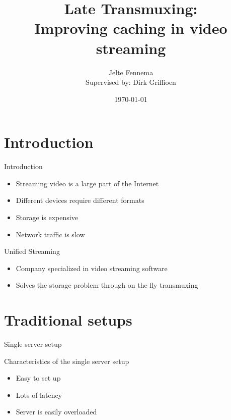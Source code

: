 \documentclass[xcolor=svgnames]{beamer}
\title[Late Transmuxing\hspace{2em}]{Late Transmuxing:\\Improving caching in video streaming}
\author[Jelte Fennema]{Jelte Fennema\\\footnotesize{Supervised by: Dirk Griffioen}}
\date{\today}
\institute{University of Amsterdam}
\begin{document}
\maketitle

\section{Introduction}

\begin{frame}{Introduction}
  \begin{itemize}
      \item Streaming video is a large part of the Internet
      \item Different devices require different formats
      \item Storage is expensive
      \item Network traffic is slow
  \end{itemize}
\end{frame}

\begin{frame}{Unified Streaming}
  \begin{itemize}
      \item Company specialized in video streaming software
      \item Solves the storage problem through on the fly transmuxing
  \end{itemize}
\end{frame}

\section{Traditional setups}

\begin{frame}{Single server setup}
    \begin{figure}

        \resizebox{\textwidth}{!}{%
            
        }
    \end{figure}
\end{frame}
\begin{frame}{Characteristics of the single server setup}
    \begin{itemize}
        \item Easy to set up

        \item Lots of latency

        \item Server is easily overloaded

    \end{itemize}
\end{frame}
\end{document}
